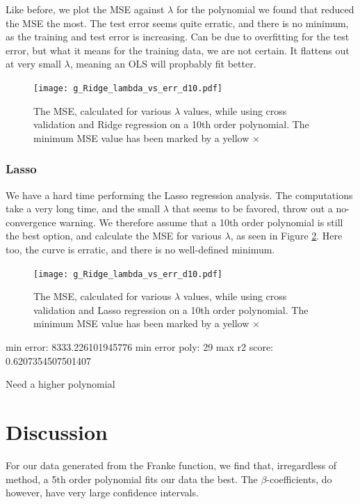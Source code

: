 \documentclass[a4paper,10pt,english]{article}
\begin{document}
Like before, we plot the MSE against $\lambda$ for the polynomial we found that reduced the MSE the most. The test error seems quite erratic, and there is no minimum, as the training and test error is increasing. Can be due to overfitting for the test error, but what it means for the training data, we are not certain. It flattens out at very small $\lambda$, meaning an OLS will propbably fit better.
\begin{figure}[H]
	\centering
	\texttt{[image: g\_Ridge\_lambda\_vs\_err\_d10.pdf]}
	\caption{The MSE, calculated for various $\lambda$ values, while using cross validation and Ridge regression on a 10th order polynomial. The minimum MSE value has been marked by a yellow $\times$}
	\label{fig:12}
\end{figure}

\subsubsection{Lasso}
We have a hard time performing the Lasso regression analysis. The computations take a very long time, and the small $\lambda$ that seems to be favored, throw out a no-convergence warning.
We therefore assume that a 10th order polynomial is still the best option, and calculate the MSE for various $\lambda$, as seen in Figure \ref{fig:13}. Here too, the curve is erratic, and there is no well-defined minimum.
\begin{figure}[H]
	\centering
	\texttt{[image: g\_Ridge\_lambda\_vs\_err\_d10.pdf]}
	\caption{The MSE, calculated for various $\lambda$ values, while using cross validation and Lasso regression on a 10th order polynomial. The minimum MSE value has been marked by a yellow $\times$}
	\label{fig:13}
\end{figure}
min error: 8333.226101945776
min error poly: 29
max r2 score: 0.6207354507501407

Need a higher polynomial

\section{Discussion}\label{sec:discussion}
For our data generated from the Franke function, we find that, irregardless of method, a 5th order polynomial fits our data the best. The $\beta$-coefficients, do however, have very large confidence intervals.
\end{document}
